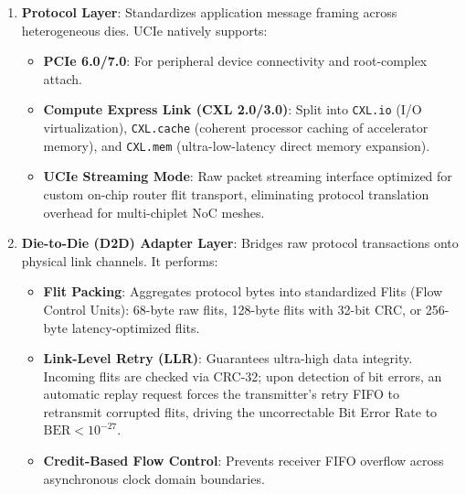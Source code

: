 \begin{enumerate}
    \item \textbf{Protocol Layer}: Standardizes application message framing across heterogeneous dies. UCIe natively supports:
    \begin{itemize}
        \item \textbf{PCIe 6.0/7.0}: For peripheral device connectivity and root-complex attach.
        \item \textbf{Compute Express Link (CXL 2.0/3.0)}: Split into \texttt{CXL.io} (I/O virtualization), \texttt{CXL.cache} (coherent processor caching of accelerator memory), and \texttt{CXL.mem} (ultra-low-latency direct memory expansion).
        \item \textbf{UCIe Streaming Mode}: Raw packet streaming interface optimized for custom on-chip router flit transport, eliminating protocol translation overhead for multi-chiplet NoC meshes.
    \end{itemize}
    
    \item \textbf{Die-to-Die (D2D) Adapter Layer}: Bridges raw protocol transactions onto physical link channels. It performs:
    \begin{itemize}
        \item \textbf{Flit Packing}: Aggregates protocol bytes into standardized Flits (Flow Control Units): 68-byte raw flits, 128-byte flits with 32-bit CRC, or 256-byte latency-optimized flits.
        \item \textbf{Link-Level Retry (LLR)}: Guarantees ultra-high data integrity. Incoming flits are checked via CRC-32; upon detection of bit errors, an automatic replay request forces the transmitter's retry FIFO to retransmit corrupted flits, driving the uncorrectable Bit Error Rate to $\text{BER} < 10^{-27}$.
        \item \textbf{Credit-Based Flow Control}: Prevents receiver FIFO overflow across asynchronous clock domain boundaries.
    \end{itemize}
    

\end{enumerate}
